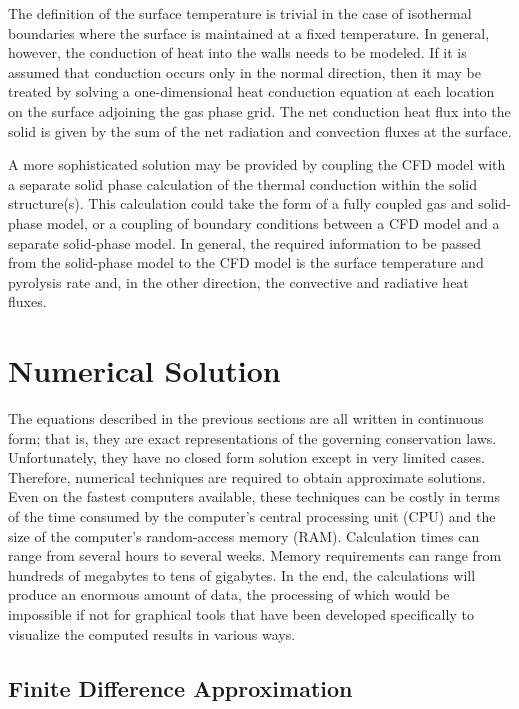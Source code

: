 \documentclass[graybox]{svmult}
\begin{document}
The definition of the surface temperature is trivial in the case of isothermal boundaries where the surface is maintained at a fixed temperature. In general, however, the conduction of heat into the walls needs to be modeled. If it is assumed that conduction occurs only in the normal direction, then it may be treated by solving a one-dimensional heat conduction equation at each location on the surface adjoining the gas phase grid. The net conduction heat flux into the solid is given by the sum of the net radiation and convection fluxes at the surface.

A more sophisticated solution may be provided by coupling the CFD model with a separate solid phase calculation of the thermal conduction within the solid structure(s). This calculation could take the form of a fully coupled gas and solid-phase model, or a coupling of boundary conditions between a CFD model and a separate solid-phase model. In general, the required information to be passed from the solid-phase model to the CFD model is the surface temperature and pyrolysis rate and, in the other direction, the convective and radiative heat fluxes.



\section{Numerical Solution}

The  equations  described  in  the  previous  sections are all written in continuous form; that is, they are exact representations of the governing conservation laws. Unfortunately, they have no closed form solution except in very limited cases. Therefore, numerical techniques are required to obtain approximate solutions. Even on the fastest computers available, these techniques can be costly in terms of the time consumed by the computer's central processing unit (CPU) and the size of the computer's random-access memory (RAM). Calculation times can range from several hours to several weeks. Memory requirements can range from hundreds of megabytes to tens of gigabytes. In the end, the calculations will produce an enormous amount of data, the processing of which would be impossible if not for graphical tools that have been developed specifically to visualize the computed results in various ways.

\subsection{Finite Difference Approximation}
\end{document}
